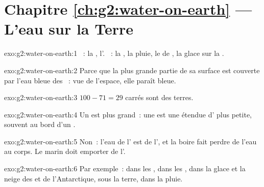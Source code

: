 \section*{Chapitre \ref{ch:g2:water-on-earth} --- L'eau sur la Terre}

\begin{solution}{exo:g2:water-on-earth:1}
~: la , l'. ~: la , la pluie, le  de
, la glace sur la .
\end{solution}

\begin{solution}{exo:g2:water-on-earth:2}
Parce que la plus grande partie de sa surface est couverte par l'eau bleue
des ~: vue de l'espace, elle paraît bleue.
\end{solution}

\begin{solution}{exo:g2:water-on-earth:3}
$100 - 71 = 29$ carrés sont des terres.
\end{solution}

\begin{solution}{exo:g2:water-on-earth:4}
Un  est plus grand~: une  est une étendue d' plus petite,
souvent au bord d'un .
\end{solution}

\begin{solution}{exo:g2:water-on-earth:5}
Non~: l'eau de l' est de l', et la boire fait perdre de l'eau
au corps. Le marin doit emporter de l'.
\end{solution}

\begin{solution}{exo:g2:water-on-earth:6}
Par exemple~: dans les , dans les , dans la glace et la neige
des  et de l'Antarctique, sous la terre, dans la pluie.
\end{solution}

